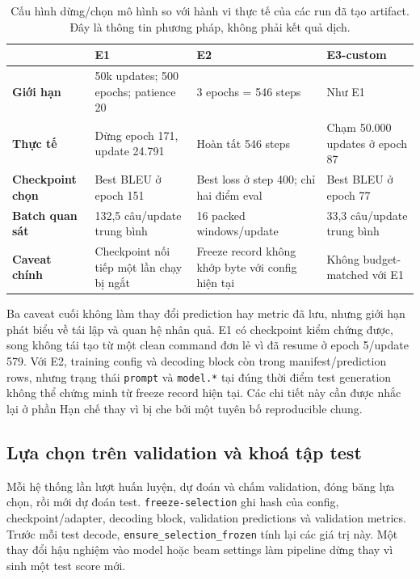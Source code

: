 \begin{table}[tbp]
  \centering
  \footnotesize
  \renewcommand{\arraystretch}{1.18}
  \caption{Cấu hình dừng/chọn mô hình so với hành vi thực tế của các run đã
  tạo artifact. Đây là thông tin phương pháp, không phải kết quả dịch.}
  \label{tab:realized}
  \begin{tabularx}{\textwidth}{@{}>{\bfseries}p{2.2cm}XXX@{}}
    \toprule
    & E1 & E2 & E3-custom \\
    \midrule
    Giới hạn
      & 50k updates; 500 epochs; patience 20
      & 3 epochs = 546 steps
      & Như E1 \\
    Thực tế
      & Dừng epoch 171, update 24.791
      & Hoàn tất 546 steps
      & Chạm 50.000 updates ở epoch 87 \\
    Checkpoint chọn
      & Best BLEU ở epoch 151
      & Best loss ở step 400; chỉ hai điểm eval
      & Best BLEU ở epoch 77 \\
    Batch quan sát
      & 132,5 câu/update trung bình
      & 16 packed windows/update
      & 33,3 câu/update trung bình \\
    Caveat chính
      & Checkpoint nối tiếp một lần chạy bị ngắt
      & Freeze record không khớp byte với config hiện tại
      & Không budget-matched với E1 \\
    \bottomrule
  \end{tabularx}
\end{table}

Ba caveat cuối không làm thay đổi prediction hay metric đã lưu, nhưng giới hạn
phát biểu về tái lập và quan hệ nhân quả. E1 có checkpoint kiểm chứng được,
song không tái tạo từ một clean command đơn lẻ vì đã resume ở epoch 5/update
579. Với E2, training config và decoding block còn trong manifest/prediction
rows, nhưng trạng thái \texttt{prompt} và \texttt{model.*} tại đúng thời điểm
test generation không thể chứng minh từ freeze record hiện tại. Các chi tiết
này cần được nhắc lại ở phần Hạn chế thay vì bị che bởi một tuyên bố
reproducible chung.

\subsection{Lựa chọn trên validation và khoá tập test}

Mỗi hệ thống lần lượt huấn luyện, dự đoán và chấm validation, đóng băng lựa
chọn, rồi mới dự đoán test. \texttt{freeze-selection} ghi hash của config,
checkpoint/adapter, decoding block, validation predictions và validation
metrics. Trước mỗi test decode, \texttt{ensure\_selection\_frozen} tính lại
các giá trị này. Một thay đổi hậu nghiệm vào model hoặc beam settings làm
pipeline dừng thay vì sinh một test score mới.

